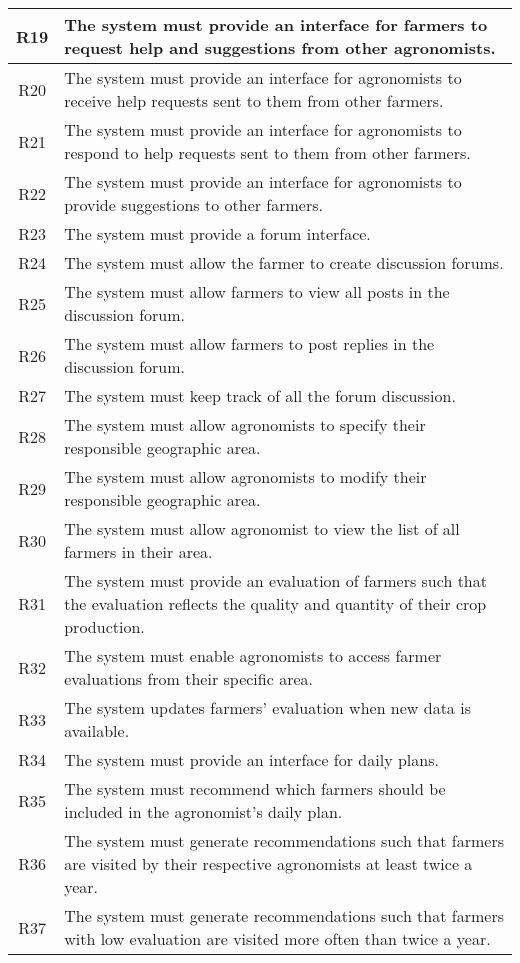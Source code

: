 \begin{center}
\begin{longtable}{|c|>{\raggedright\arraybackslash}m{15cm}|}
R19	& The system must provide an interface for farmers to request help and suggestions from other agronomists.\\\hline
R20	& The system must provide an interface for agronomists to receive help requests sent to them from other farmers.\\\hline
R21	& The system must provide an interface for agronomists to respond to help requests sent to them from other farmers.\\\hline
R22	& The system must provide an interface for agronomists to provide suggestions to other farmers.\\\hline
R23	& The system must provide a forum interface.\\\hline
R24	& The system must allow the farmer to create discussion forums.\\\hline
R25	& The system must allow farmers to view all posts in the discussion forum.\\\hline
R26	& The system must allow farmers to post replies in the discussion forum.\\\hline
R27	& The system must keep track of all the forum discussion.\\\hline
R28	& The system must allow agronomists to specify their responsible geographic area.\\\hline
R29	& The system must allow agronomists to modify their responsible geographic area.\\\hline 
R30	& The system must allow agronomist to view the list of all farmers in their area. \\\hline
R31	& The system must provide an evaluation of farmers such that the evaluation reflects the quality and quantity of their crop production.\\\hline
R32	& The system must enable agronomists to access farmer evaluations from their specific area.\\\hline
R33	& The system updates farmers' evaluation when new data is available.\\\hline %
R34	& The system must provide an interface for daily plans.\\\hline
R35	& The system must recommend which farmers should be included in the agronomist's daily plan.\\\hline
R36	& The system must generate recommendations such that farmers are visited by their respective agronomists at least twice a year.\\\hline
R37	& The system must generate recommendations such that farmers with low evaluation are visited more often than twice a year.\\\hline

\end{longtable}
\end{center}

